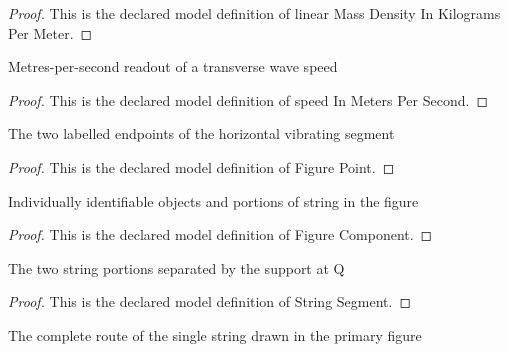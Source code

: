 \begin{proof}
  This is the declared model definition of linear Mass Density In Kilograms Per Meter.
\end{proof}
\begin{definition}
  \label{def:physics:phyx-mini-0298:phyxminiproblems-problemphyxmini0298-speedinmeterspersecond}
  Metres-per-second readout of a transverse wave speed
\end{definition}
\begin{proof}
  This is the declared model definition of speed In Meters Per Second.
\end{proof}
\begin{definition}
  \label{def:physics:phyx-mini-0298:phyxminiproblems-problemphyxmini0298-figurepoint}
  The two labelled endpoints of the horizontal vibrating segment
\end{definition}
\begin{proof}
  This is the declared model definition of Figure Point.
\end{proof}
\begin{definition}
  \label{def:physics:phyx-mini-0298:phyxminiproblems-problemphyxmini0298-figurecomponent}
  Individually identifiable objects and portions of string in the figure
\end{definition}
\begin{proof}
  This is the declared model definition of Figure Component.
\end{proof}
\begin{definition}
  \label{def:physics:phyx-mini-0298:phyxminiproblems-problemphyxmini0298-stringsegment}
  The two string portions separated by the support at Q
\end{definition}
\begin{proof}
  This is the declared model definition of String Segment.
\end{proof}
\begin{definition}
  \label{def:physics:phyx-mini-0298:phyxminiproblems-problemphyxmini0298-stringroute}
  The complete route of the single string drawn in the primary figure
\end{definition}
